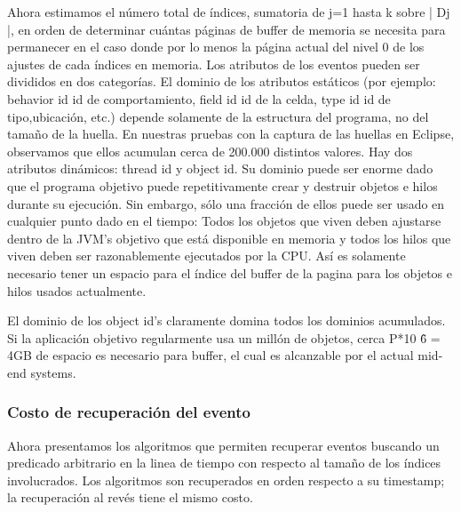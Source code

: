 \documentclass[12pt,a4paper]{report}
\begin{document}
	Ahora estimamos el número total de índices, sumatoria de j=1 hasta k sobre | Dj |, en orden de determinar cuántas páginas de buffer de memoria se necesita para permanecer en el caso donde por lo menos la página actual del nivel 0 de los ajustes de cada índices en memoria.  Los atributos de los eventos pueden ser divididos en dos categorías.  El dominio de los atributos estáticos (por ejemplo: behavior id {id de comportamiento}, field id {id de la celda}, type id {id de tipo},ubicación, etc.) depende solamente de la estructura del programa, no del tamaño de la huella.  En nuestras pruebas con la captura de las huellas en Eclipse, observamos que ellos acumulan cerca de 200.000 distintos valores.  Hay dos atributos dinámicos: thread id y object id.  Su dominio puede ser enorme dado que el programa objetivo puede repetitivamente crear y destruir objetos e hilos durante su ejecución.  Sin embargo, sólo una fracción de ellos puede ser usado en cualquier punto dado en el tiempo:  Todos los objetos que viven deben ajustarse dentro de la JVM's objetivo que está disponible en memoria y todos los hilos que viven deben ser razonablemente ejecutados por la CPU.  Así es solamente necesario tener un espacio para el índice del buffer de la pagina para los objetos e hilos usados actualmente.

	El dominio de los  object id's claramente domina todos los dominios acumulados.  Si la aplicación objetivo regularmente usa un millón de objetos, cerca P*10 \^ 6 = 4GB de espacio es necesario para buffer, el cual es alcanzable por el actual mid-end systems.


			\subsubsection{Costo de recuperación del evento}

	Ahora presentamos los algoritmos que permiten recuperar eventos buscando un predicado arbitrario en la linea de tiempo con respecto al tamaño de los índices involucrados.  Los algoritmos son recuperados en orden respecto a su timestamp; la recuperación al revés tiene el mismo costo.
\end{document}
